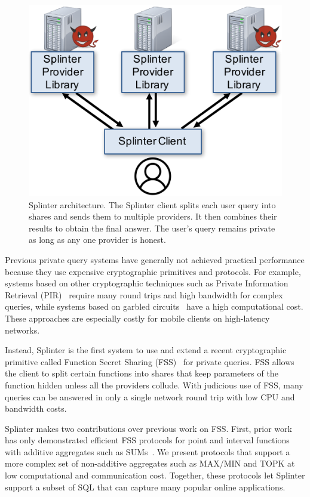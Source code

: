\begin{figure}
	\centering
	\includegraphics[width=\textwidth]{splinter-figs/overview.pdf}
	\caption[Overview of Splinter architecture.]{
		Splinter architecture. 
		The Splinter client splits each user query into shares and sends them to multiple
		providers. It then combines their results to obtain
		the final answer.
		The user's query remains private as long as any one provider is honest.
	}
	\label{fig:overview}
\end{figure}

Previous private query systems have generally not achieved practical performance
because they use expensive cryptographic primitives and protocols.
For example, systems based on other cryptographic techniques such
as Private Information Retrieval (PIR)~\cite{goldberg,chor1997private,pir-search} 
require many round trips and high bandwidth for complex queries, while systems based on garbled
circuits~\cite{wu2016,lan2016embark,ben2008fairplaymp} have a high computational cost.
These approaches are especially costly for mobile clients on high-latency networks.

Instead, Splinter is the first system to use and extend a recent cryptographic primitive called
Function Secret Sharing (FSS)~\cite{fss, gilboa2014distributed} for private queries.
FSS allows the client to split certain functions into shares that keep parameters of the
function hidden unless all the providers collude.
With judicious use of FSS, many queries can be answered in only a single network round trip
with low CPU and bandwidth costs.

Splinter makes two contributions over previous work on FSS.
First, prior work has only demonstrated efficient FSS protocols for point and interval functions with additive aggregates such as SUMs~\cite{fss}.
We present protocols that support a more complex set of non-additive aggregates such as MAX/MIN and TOPK at low computational and communication cost.
Together, these protocols let Splinter support a subset of SQL that can capture many popular online applications.

